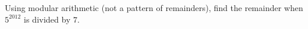 Using modular arithmetic (not a pattern of remainders), find the remainder when $5^{2012}$ is divided by $7$.
